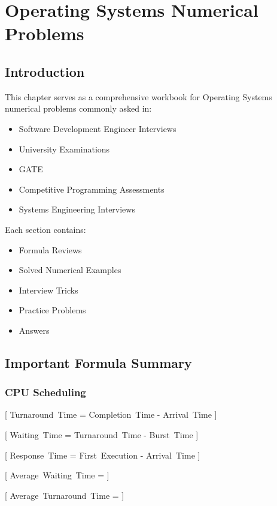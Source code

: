 \chapter{Operating Systems Numerical Problems}

\section{Introduction}

This chapter serves as a comprehensive workbook for Operating Systems numerical problems commonly asked in:

\begin{itemize}
\item Software Development Engineer Interviews
\item University Examinations
\item GATE
\item Competitive Programming Assessments
\item Systems Engineering Interviews
\end{itemize}

Each section contains:

\begin{itemize}
\item Formula Reviews
\item Solved Numerical Examples
\item Interview Tricks
\item Practice Problems
\item Answers
\end{itemize}

\section{Important Formula Summary}

\subsection{CPU Scheduling}

[
Turnaround\ Time = Completion\ Time - Arrival\ Time
]

[
Waiting\ Time = Turnaround\ Time - Burst\ Time
]

[
Response\ Time = First\ Execution - Arrival\ Time
]

[
Average\ Waiting\ Time =
]

[
Average\ Turnaround\ Time =
]

